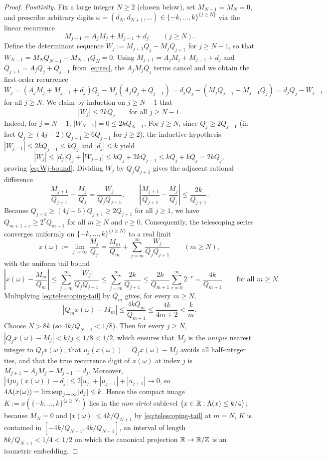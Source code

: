 \begin{proof}
\emph{Positivity.} Fix a large integer $N\ge2$ (chosen below), set
$M_{N-1}=M_N=0$, and prescribe arbitrary digits
$\omega=(d_N,d_{N+1},\dots)\in\{-k,\ldots,k\}^{\{j\ge N\}}$ via the linear
recurrence
\[
M_{j+1}=A_jM_j+M_{j-1}+d_j\qquad(j\ge N).
\]
Define the determinant sequence $W_j:=M_{j+1}Q_j-M_jQ_{j+1}$ for $j\ge N-1$, so
that $W_{N-1}=M_NQ_{N-1}-M_{N-1}Q_N=0$. Using $M_{j+1}=A_jM_j+M_{j-1}+d_j$ and
$Q_{j+1}=A_jQ_j+Q_{j-1}$ from \eqref{eq:rec}, the $A_jM_jQ_j$ terms cancel and
we obtain the first-order recurrence
\[
W_j=(A_jM_j+M_{j-1}+d_j)Q_j-M_j(A_jQ_j+Q_{j-1})
=d_jQ_j-(M_jQ_{j-1}-M_{j-1}Q_j)=d_jQ_j-W_{j-1}
\]
for all $j\ge N$. We claim by induction on $j\ge N-1$ that
\begin{equation}\label{eq:Wj-bound}
|W_j|\le 2kQ_j\qquad\text{for all }j\ge N-1.
\end{equation}
Indeed, for $j=N-1$, $|W_{N-1}|=0\le2kQ_{N-1}$. For $j\ge N$, since $Q_j\ge2Q_{j-1}$
(in fact $Q_j\ge(4j-2)Q_{j-1}\ge6Q_{j-1}$ for $j\ge2$), the inductive
hypothesis $|W_{j-1}|\le2kQ_{j-1}\le kQ_j$ and $|d_j|\le k$ yield
\[
|W_j|\le|d_j|Q_j+|W_{j-1}|\le kQ_j+2kQ_{j-1}\le kQ_j+kQ_j=2kQ_j,
\]
proving \eqref{eq:Wj-bound}. Dividing $W_j$ by $Q_jQ_{j+1}$ gives the adjacent
rational difference
\[
\frac{M_{j+1}}{Q_{j+1}}-\frac{M_j}{Q_j}=\frac{W_j}{Q_jQ_{j+1}},\qquad
\left|\frac{M_{j+1}}{Q_{j+1}}-\frac{M_j}{Q_j}\right|\le\frac{2k}{Q_{j+1}}.
\]
Because $Q_{j+2}\ge(4j+6)Q_{j+1}\ge2Q_{j+1}$ for all $j\ge1$, we have
$Q_{m+1+r}\ge2^r Q_{m+1}$ for all $m\ge N$ and $r\ge0$. Consequently, the
telescoping series converges uniformly on $\{-k,\dots,k\}^{\{j\ge N\}}$ to a
real limit
\[
x(\omega):=\lim_{j\to\infty}\frac{M_j}{Q_j}
=\frac{M_m}{Q_m}+\sum_{j=m}^\infty\frac{W_j}{Q_jQ_{j+1}}\qquad(m\ge N),
\]
with the uniform tail bound
\begin{equation}\label{eq:telescoping-tail}
\left|x(\omega)-\frac{M_m}{Q_m}\right|
\le\sum_{j=m}^\infty\frac{|W_j|}{Q_jQ_{j+1}}
\le\sum_{j=m}^\infty\frac{2k}{Q_{j+1}}
\le\frac{2k}{Q_{m+1}}\sum_{r=0}^\infty 2^{-r}
=\frac{4k}{Q_{m+1}}\qquad\text{for all }m\ge N.
\end{equation}
Multiplying \eqref{eq:telescoping-tail} by $Q_m$ gives, for every $m\ge N$,
\[
|Q_mx(\omega)-M_m|\le\frac{4kQ_m}{Q_{m+1}}\le\frac{4k}{4m+2}<\frac{k}{m}.
\]
Choose $N>8k$ (so $4k/Q_{N+1}<1/8$). Then for every $j\ge N$,
$|Q_jx(\omega)-M_j|<k/j<1/8<1/2$, which ensures that $M_j$ is the \emph{unique}
nearest integer to $Q_jx(\omega)$, that $u_j(x(\omega))=Q_jx(\omega)-M_j$ avoids
all half-integer ties, and that the true recurrence digit of $x(\omega)$ at
index $j$ is $M_{j+1}-A_jM_j-M_{j-1}=d_j$. Moreover,
$|4ju_j(x(\omega))-d_j|\le2|u_j|+|u_{j-1}|+|u_{j+1}|\to0$, so
$4\Lambda(x(\omega))=\limsup_{j\to\infty}|d_j|\le k$. Hence the compact image
$K:=x(\{-k,\dots,k\}^{\{j\ge N\}})$ lies in the \emph{non-strict} sublevel
$\{x\in\mathbb{R}:\Lambda(x)\le k/4\}$; because $M_N=0$ and $|x(\omega)|\le4k/Q_{N+1}$ by
\eqref{eq:telescoping-tail} at $m=N$, $K$ is contained in
$[-4k/Q_{N+1},4k/Q_{N+1}]$, an interval of length $8k/Q_{N+1}<1/4<1/2$ on which
the canonical projection $\mathbb{R}\to\mathbb{R}/\mathbb{Z}$ is an isometric embedding.


\end{proof}
